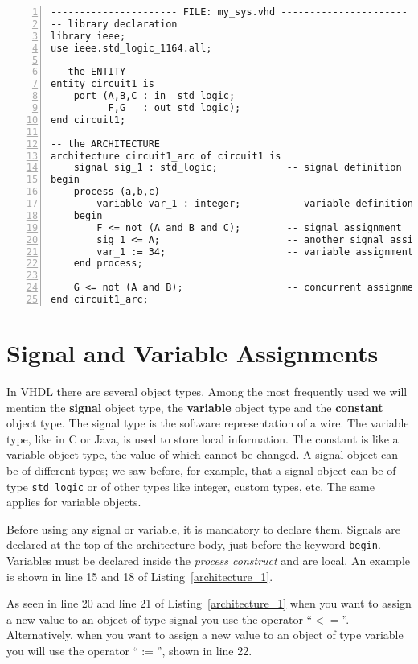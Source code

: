 \begin{lstlisting}[float, numbers=left, label=architecture_1, caption=Example of a simple VHDL block.]
---------------------- FILE: my_sys.vhd ----------------------
-- library declaration
library ieee;
use ieee.std_logic_1164.all;

-- the ENTITY
entity circuit1 is
	port (A,B,C : in  std_logic;
	      F,G   : out std_logic);
end circuit1;

-- the ARCHITECTURE
architecture circuit1_arc of circuit1 is
	signal sig_1 : std_logic;            -- signal definition
begin
	process (a,b,c)
	    variable var_1 : integer;        -- variable definition
	begin
	    F <= not (A and B and C);        -- signal assignment
	    sig_1 <= A;                      -- another signal assignment
	    var_1 := 34;                     -- variable assignment
	end process;

	G <= not (A and B);                  -- concurrent assignment
end circuit1_arc;
\end{lstlisting}

\section{Signal and Variable Assignments}
In VHDL there are several object types. Among the most frequently used we will mention the \textbf{signal} object type, the \textbf{variable} object type and the \textbf{constant} object type. The signal type is the software representation of a wire. The variable type, like in C or Java, is used to store local information. The constant is like a variable object type, the value of which cannot be changed. A signal object can be of different types; we saw before, for example, that a signal object can be of type \texttt{std\_logic} or of other types like integer, custom types, etc. The same applies for variable objects.

Before using any signal or variable, it is mandatory to declare them. Signals are declared at the top of the architecture body, just before the keyword \texttt{begin}. Variables must be declared inside the \textit{process construct} and are local. An example is shown in line 15 and 18 of Listing~\ref{architecture_1}.

As seen in line 20 and line 21 of Listing~\ref{architecture_1} when you want to assign a new value to an object of type signal you use the operator ``$<=$''. Alternatively, when you want to assign a new value to an object of type variable you will use the operator ``$:=$'', shown in line 22.

